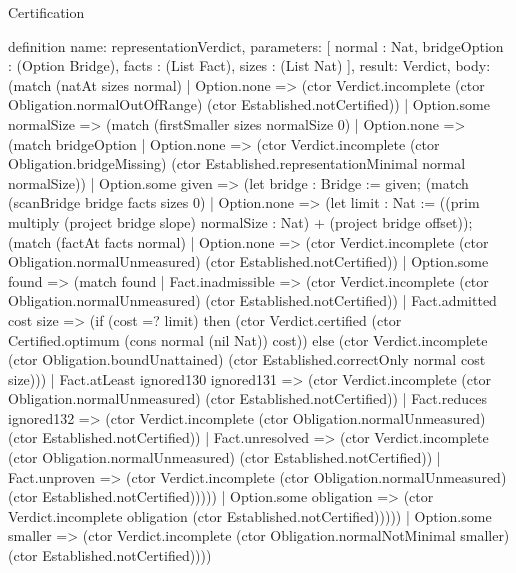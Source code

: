 \begin{lexlean}{Certification}
\begin{semanticmodule}
definition{
  name: representationVerdict,
  parameters: [
    normal : Nat,
    bridgeOption : (Option Bridge),
    facts : (List Fact),
    sizes : (List Nat)
  ],
  result: Verdict,
  body: (match (natAt sizes normal)
    | Option.none => (ctor Verdict.incomplete (ctor Obligation.normalOutOfRange) (ctor Established.notCertified))
    | Option.some normalSize => (match (firstSmaller sizes normalSize 0)
      | Option.none => (match bridgeOption
        | Option.none => (ctor Verdict.incomplete (ctor Obligation.bridgeMissing) (ctor Established.representationMinimal normal normalSize))
        | Option.some given => (let bridge : Bridge := given; (match (scanBridge bridge facts sizes 0)
          | Option.none => (let limit : Nat := ((prim multiply (project bridge slope) normalSize : Nat) + (project bridge offset)); (match (factAt facts normal)
            | Option.none => (ctor Verdict.incomplete (ctor Obligation.normalUnmeasured) (ctor Established.notCertified))
            | Option.some found => (match found
              | Fact.inadmissible => (ctor Verdict.incomplete (ctor Obligation.normalUnmeasured) (ctor Established.notCertified))
              | Fact.admitted cost size => (if (cost =? limit) then (ctor Verdict.certified (ctor Certified.optimum (cons normal (nil Nat)) cost)) else (ctor Verdict.incomplete (ctor Obligation.boundUnattained) (ctor Established.correctOnly normal cost size)))
              | Fact.atLeast ignored130 ignored131 => (ctor Verdict.incomplete (ctor Obligation.normalUnmeasured) (ctor Established.notCertified))
              | Fact.reduces ignored132 => (ctor Verdict.incomplete (ctor Obligation.normalUnmeasured) (ctor Established.notCertified))
              | Fact.unresolved => (ctor Verdict.incomplete (ctor Obligation.normalUnmeasured) (ctor Established.notCertified))
              | Fact.unproven => (ctor Verdict.incomplete (ctor Obligation.normalUnmeasured) (ctor Established.notCertified)))))
          | Option.some obligation => (ctor Verdict.incomplete obligation (ctor Established.notCertified)))))
      | Option.some smaller => (ctor Verdict.incomplete (ctor Obligation.normalNotMinimal smaller) (ctor Established.notCertified))))
}


\end{semanticmodule}
\end{lexlean}
